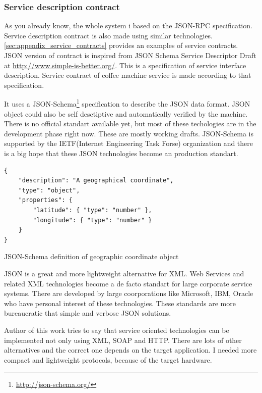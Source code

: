 \subsubsection{Service description contract}
\label{sec:service_json_contract}

As you already know, the whole system i based on the JSON-RPC specification.
Service description contract is also made using similar technologies.
\autoref{sec:appendix_service_contracts} provides an examples of service contracts.
JSON version of contract is inspired from JSON Schema Service Descriptor Draft at \url{http://www.simple-is-better.org/}.
This is a specification of service interface description. 
Service contract of coffee machine service is made according to that specification.

It uses a JSON-Schema\footnote{\url{http://json-schema.org/}} specification to describe the JSON data format. 
JSON object could also be self desctiptive and automatically verified by the machine.
There is no official standart available yet, but most of these techologies are in the development phase right now. 
These are mostly working drafts.
JSON-Schema is supported by the IETF(Internet Engineering Task Forse) organization and there is a big hope that these JSON technologies become an production standart.


\begin{listing}[h]
\begin{verbatim}
{
    "description": "A geographical coordinate",
    "type": "object",
    "properties": {
        "latitude": { "type": "number" },
        "longitude": { "type": "number" }
    }
}
\end{verbatim}
\caption{JSON-Schema definition of geographic coordinate object}
\label{lst:json_schema_geo}
\end{listing}

JSON is a great and more lightweight alternative for XML.
Web Services and related XML technologies become a de facto standart for large corporate service systems. 
There are developed by large coorporations like Microsoft, IBM, Oracle who have personal interest of these technologies.
These standards are more bureaucratic that simple and verbose JSON solutions. 

Author of this work tries to say that service oriented technologies can be implemented not only using XML, SOAP and HTTP.
There are lots of other alternatives and the correct one depends on the target application.
I needed more compact and lightweight protocols, because of the target hardware. 

